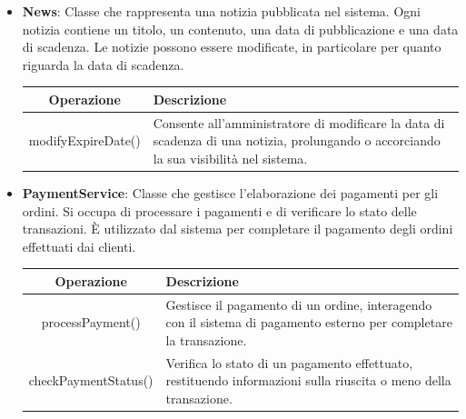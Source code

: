 \begin{itemize}
    \item \textbf{News}:
Classe che rappresenta una notizia pubblicata nel sistema. Ogni notizia contiene un titolo, un contenuto, una data di pubblicazione e una data di scadenza. Le notizie possono essere modificate, in particolare per quanto riguarda la data di scadenza.
\begin{table}[!htbp]
    \centering
    \begin{tabularx}{\textwidth}{| c | X |}
    \hline
         \textbf{Operazione} & \textbf{Descrizione} \\
         \hline
         modifyExpireDate() & Consente all'amministratore di modificare la data di scadenza di una notizia, prolungando o accorciando la sua visibilità nel sistema. \\
         \hline
    \end{tabularx}
\end{table}

\item \textbf{PaymentService}:
Classe che gestisce l'elaborazione dei pagamenti per gli ordini. Si occupa di processare i pagamenti e di verificare lo stato delle transazioni. È utilizzato dal sistema per completare il pagamento degli ordini effettuati dai clienti.
\begin{table}[!htbp]
    \centering
    \begin{tabularx}{\textwidth}{| c | X |}
    \hline
         \textbf{Operazione} & \textbf{Descrizione} \\
         \hline
         processPayment() & Gestisce il pagamento di un ordine, interagendo con il sistema di pagamento esterno per completare la transazione. \\
         \hline
         checkPaymentStatus() & Verifica lo stato di un pagamento effettuato, restituendo informazioni sulla riuscita o meno della transazione. \\
         \hline
    \end{tabularx}
\end{table}


\end{itemize}
